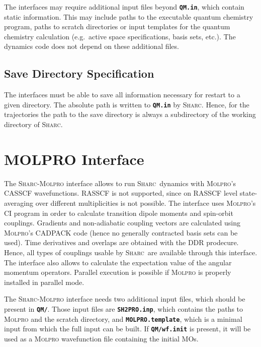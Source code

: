 \documentclass[a4paper,11pt,DIV=15,openany,twoside=false]{scrbook}
\newcommand{\sharc}{\textsc{Sharc}}
\newcommand{\ttt}[1]{\textbf{\texttt{#1}}}
\begin{document}
The interfaces may require additional input files beyond \ttt{QM.in}, which contain static information. This may include paths to the executable quantum chemistry program, paths to scratch directories or input templates for the quantum chemistry calculation (e.g.\ active space specifications, basis sets, etc.).
The dynamics code does not depend on these additional files.

\subsection{Save Directory Specification}

The interfaces must be able to save all information necessary for restart to a given directory. The absolute path is written to \ttt{QM.in} by \sharc. Hence, for the trajectories the path to the save directory is always a subdirectory of the working directory of \sharc.


\clearpage
\section{MOLPRO Interface}\label{sec:int:molpro}

The \sharc-\textsc{Molpro} interface allows to run \sharc\ dynamics with \textsc{Molpro}'s CASSCF wavefunctions. RASSCF is not supported, since on RASSCF level state-averaging over different multiplicities is not possible. The interface uses \textsc{Molpro}'s CI program in order to calculate transition dipole moments and spin-orbit couplings. Gradients and non-adiabatic coupling vectors are calculated using \textsc{Molpro}'s CADPACK code (hence no generally contracted basis sets can be used). Time derivatives and overlaps are obtained with the DDR prodecure. Hence, all types of couplings usable by \sharc\ are available through this interface. The interface also allows to calculate the expectation value of the angular momentum operators. Parallel execution is possible if \textsc{Molpro} is properly installed in parallel mode.

The \sharc-\textsc{Molpro} interface needs two additional input files, which should be present in \ttt{QM/}. Those input files are \ttt{SH2PRO.inp}, which contains the paths to \textsc{Molpro} and the scratch directory, and \ttt{MOLPRO.template}, which is a minimal input from which the full input can be built. If \ttt{QM/wf.init} is present, it will be used as a \textsc{Molpro} wavefunction file containing the initial MOs.
\end{document}
